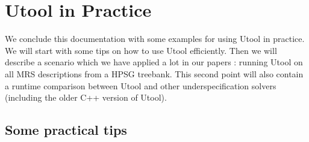 
\section{Utool in Practice} \label{sec:practice}

We conclude this documentation with some examples for using Utool in
practice. We will start with some tips on how to use Utool
efficiently. Then we will describe a scenario which we have applied a
lot in our papers \cite{FucKolNieTha04,FliKolTha05,KolTha05b}: running
Utool on all MRS descriptions from a HPSG treebank. This second point
will also contain a runtime comparison between Utool and other
underspecification solvers (including the older C++ version of
Utool). 

\subsection{Some practical tips} \label{sec:practice-some-practical-tips}


